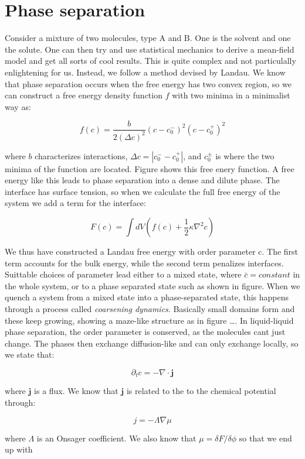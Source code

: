 \documentclass[12pt,a4paper,]{Dissertate}
\begin{document}
\hypertarget{phase-separation}{%
\section{Phase separation}\label{phase-separation}}

Consider a mixture of two molecules, type A and B. One is the solvent
and one the solute. One can then try and use statistical mechanics to
derive a mean-field model and get all sorts of cool results. This is
quite complex and not particulally enlightening for us. Instead, we
follow a method devised by Landau. We know that phase separation occurs
when the free energy has two convex region, so we can construct a free
energy density function \(f\) with two minima in a minimalist way as:

\[
f(c) = \frac{b}{2(\Delta c)^2}(c-c_0^-)^2(c-c_0^+)^2
\]

where \(b\) characterizes interactions, \(\Delta c = |c_0^--c_0^+|\),
and \(c_0^\pm\) is where the two minima of the function are located.
Figure shows this free enery function. A free energy like this leads to
phase separation into a dense and dilute phase. The interface has
surface tension, so when we calculate the full free energy of the system
we add a term for the interface:

\[
F(c) = \int dV (f(c)+\frac{1}{2}\kappa \nabla^2c)
\]

We thus have constructed a Landau free energy with order parameter c.
The first term accounts for the bulk energy, while the second term
penalizes interfaces. Suittable choices of parameter lead either to a
mixed state, where \(\bar{c}=constant\) in the whole system, or to a
phase separated state such as shown in figure. When we quench a system
from a mixed state into a phase-separated state, this happens through a
process called \emph{coarsening dynamics}. Basically small domains form
and these keep growing, showing a maze-like structure as in figure
\ldots{}. In liquid-liquid phase separation, the order parameter is
conserved, as the molecules cant just change. The phases then exchange
diffusion-like and can only exchange locally, so we state that:

\[
\partial_t c = -\nabla \cdot \mathbf{j}
\]

where \(\mathbf{j}\) is a flux. We know that \(\mathbf{j}\) is related
to the to the chemical potential through:

\[
j = -\Lambda \nabla \mu
\]

where \(\Lambda\) is an Onsager coefficient. We also know that
\(\mu = \delta F/ \delta \phi\) so that we end up with
\end{document}
